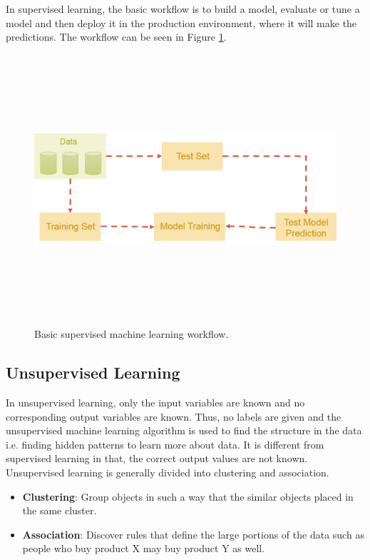 In supervised learning, the basic workflow is to build a model, evaluate or tune a model and then deploy it in the production environment, where it will make the predictions. The workflow can be seen in Figure \ref{fig:basic-ml-model}.


\begin{figure}[htpb]
	\centering
	\includegraphics[width=12cm,height=10cm,keepaspectratio=true]{images/basic-ml-model.png}
	\caption{
		Basic supervised machine learning workflow.
	}
	\label{fig:basic-ml-model}
\end{figure}

\subsection{Unsupervised Learning}

In unsupervised learning, only the input variables are known and no corresponding output variables are known. Thus, no labels are given and the unsupervised machine learning algorithm is used to find the structure in the data i.e. finding hidden patterns to learn more about data. It is different from supervised learning in that, the correct output values are not known. Unsupervised learning is generally divided into clustering and association.

\begin{itemize}
	\item \textbf{Clustering}: Group objects in such a way that the similar objects placed in the same cluster.
	\item \textbf{Association}: Discover rules that define the large portions of the data such as people who buy product X may buy product Y as well.
\end{itemize}

